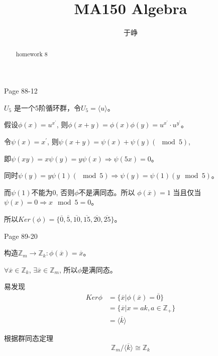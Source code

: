 \documentclass{ximera}
\title{MA150 Algebra}
\author{于峥}
\begin{document}
\begin{abstract}
    homework 8
\end{abstract}

\maketitle

\begin{problem} Page 88-12
    \begin{solution}
        $U_5$ 是一个5阶循环群，令$U_5 = \langle u \rangle$。

        假设$\phi(x)=u^{x^{'}}$, 则$\phi(x+y)=\phi(x)\phi(y)=u^{x^{'}}\cdot u^{y^{'}}$。

        令$\psi(x)=x^{'}$, 则$\psi(x+y)=\psi(x)+\psi(y)(\mod 5)$,
        
        即$\psi(xy)=x\psi(y)=y\psi(x) \Rightarrow \psi(5x)=0$。

        同时$\psi(y) = y\psi(1) (\mod 5) \Rightarrow \psi(y) = \psi(1)(y \mod 5)$。

        而$\psi(1)$不能为$0$, 否则$\phi$不是满同态。所以
        $\phi(\overline{x}) = 1$ 当且仅当 $\psi(x)=0\Rightarrow x \mod 5 = 0$。

        所以$Ker(\phi) = \{
            \overline{0},    
            \overline{5},    
            \overline{10},    
            \overline{15},    
            \overline{20},    
            \overline{25}\}$。
    \end{solution}
\end{problem}

\begin{problem} Page 89-20
    \begin{solution}
        构造$\mathbb{Z}_m \rightarrow \mathbb{Z}_k : \phi(\overline{{x}})=\overline{x}$。

        $\forall \overline{x} \in \mathbb{Z}_k$, $\exists \overline{x} \in \mathbb{Z}_m$, 所以$\phi$是满同态。

        易发现
        $$
        \begin{aligned}
            Ker \phi &= \{ \overline{x} | \phi(\overline{x}) = \overline{0}\} \\
            &= \{ \overline{x} | x = ak, a \in \mathbb{Z}_+\} \\
            &= \langle \overline{k} \rangle
        \end{aligned}
        $$

        根据群同态定理
        $$
            \mathbb{Z}_m / \langle \overline{k} \rangle \cong \mathbb{Z}_k
        $$
    \end{solution}
\end{problem}
\end{document}
